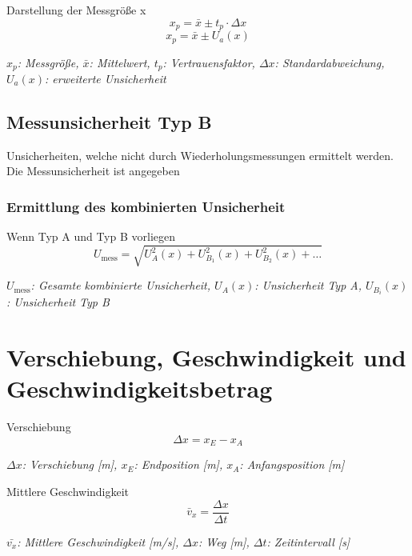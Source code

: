 \documentclass[a4paper,10pt]{article}
\newenvironment{displayformula}
{
	\begin{framed}
		\color{formulaColor}
	}
	{\end{framed}}
\newcommand{\formulalegend}[1]{%
	\par\vspace{0.5ex}%
	{{\color{legendColor}\RaggedRight\small\textit{#1}}}%
	\par\vspace{1.5ex}%
}
\begin{document}
	\begin{displayformula}
		Darstellung der Messgröße x
		\[
		x_p = \bar{x} \pm t_p \cdot \Delta x
		\]
		\[
		x_p = \bar{x} \pm U_a (x)
		\]
	\end{displayformula}
	\formulalegend{
		\( x_p \): Messgröße, \( \bar{x} \): Mittelwert, \( t_p \): Vertrauensfaktor, \( \Delta x \): Standardabweichung, \( U_a(x) \): erweiterte Unsicherheit
	}
	
	\subsection{Messunsicherheit Typ B}
	\begin{displayformula}
		Unsicherheiten, welche nicht durch Wiederholungsmessungen ermittelt werden. \\ Die Messunsicherheit ist angegeben
	\end{displayformula}
	
	\subsubsection{Ermittlung des kombinierten Unsicherheit}
	
	\begin{displayformula}
		Wenn Typ A und Typ B vorliegen
		\[
		U_\text{mess} = \sqrt{U^2_A(x) + U^2_{B_1}(x) + U^2_{B_2}(x) + \dots}
		\]
	\end{displayformula}
	\formulalegend{
		\( U_\text{mess} \): Gesamte kombinierte Unsicherheit, \( U_A(x) \): Unsicherheit Typ A, \( U_{B_i}(x) \): Unsicherheit Typ B
	}
	
	
	
\section{Verschiebung, Geschwindigkeit und \\Geschwindigkeitsbetrag}

\begin{displayformula}
	Verschiebung
	\[
	\Delta x = x_E - x_A
	\]
\end{displayformula}
\formulalegend{
	\( \Delta x \): Verschiebung [m], \( x_E \): Endposition [m], \( x_A \): Anfangsposition [m]
}

\begin{displayformula}
	Mittlere Geschwindigkeit
	\[
	\bar{v}_x = \frac{\Delta x}{\Delta t}
	\]
\end{displayformula}
\formulalegend{
	\( \bar{v_x} \): Mittlere Geschwindigkeit [m/s], \( \Delta x \): Weg [m], \( \Delta t \): Zeitintervall [s]
}
\end{document}
